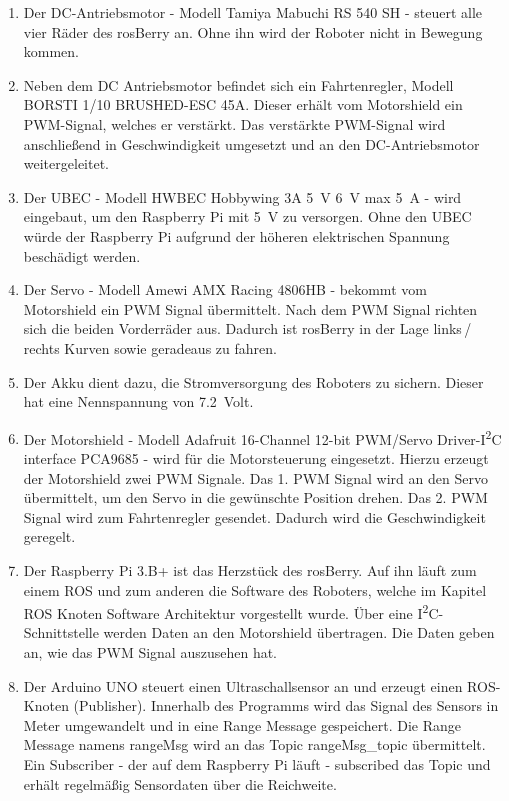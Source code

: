 \documentclass[conference]{IEEEtran}
\begin{document}
	\begin{enumerate}
		\item Der DC-Antriebsmotor - Modell Tamiya Mabuchi RS 540 SH - steuert alle vier Räder des rosBerry an.
		Ohne ihn wird der Roboter nicht in Bewegung kommen.
		\item Neben dem DC Antriebsmotor befindet sich ein Fahrtenregler, Modell BORSTI 1/10 BRUSHED-ESC 45A.
		Dieser erhält vom Motorshield ein PWM-Signal, welches er verstärkt.
		Das verstärkte PWM-Signal wird anschließend in Geschwindigkeit umgesetzt und an den DC-Antriebsmotor weitergeleitet.
		\item Der UBEC - Modell HWBEC Hobbywing 3A \SI{5}{V} \SI{6}{V} max \SI{5}{A} - wird eingebaut, um den Raspberry Pi mit \SI{5}{V} zu versorgen.
		Ohne den UBEC würde der Raspberry Pi aufgrund der höheren elektrischen Spannung beschädigt werden.
		\item Der Servo - Modell Amewi AMX Racing 4806HB - bekommt vom Motorshield ein PWM Signal übermittelt.
		Nach dem PWM Signal richten sich die beiden Vorderräder aus.
		Dadurch ist rosBerry in der Lage links\,/\,rechts Kurven sowie geradeaus zu fahren.
		\item Der Akku dient dazu, die Stromversorgung des Roboters zu sichern.
		Dieser hat eine Nennspannung von \SI{7,2}{Volt}. 
		\item Der Motorshield - Modell Adafruit 16-Channel 12-bit PWM/Servo 
		Driver-I\textsuperscript{2}C interface PCA9685 - wird für die 
		Motorsteuerung eingesetzt.
		Hierzu erzeugt der Motorshield zwei PWM Signale.
		Das 1. PWM Signal wird an den Servo übermittelt, um den Servo in die 
		gewünschte Position drehen.
		Das 2. PWM Signal wird zum Fahrtenregler gesendet.
		Dadurch wird die Geschwindigkeit geregelt.
		\item Der Raspberry Pi 3.B+ ist das Herzstück des rosBerry.
		Auf ihn läuft zum einem ROS und zum anderen die Software des Roboters, welche im Kapitel ROS Knoten Software Architektur vorgestellt wurde.
		Über eine I\textsuperscript{2}C-Schnittstelle werden Daten an den 
		Motorshield übertragen.
		Die Daten geben an, wie das PWM Signal auszusehen hat.
		\item Der Arduino UNO  steuert einen Ultraschallsensor an und erzeugt 
		einen ROS-Knoten (Publisher).
		Innerhalb des Programms wird das Signal des Sensors in Meter umgewandelt und in eine Range Message gespeichert.
		Die Range Message namens rangeMsg wird an das Topic rangeMsg\_topic übermittelt.
		Ein Subscriber - der auf dem Raspberry Pi läuft - subscribed das Topic und erhält regelmäßig Sensordaten über die Reichweite.
		

\end{enumerate}
\end{document}
